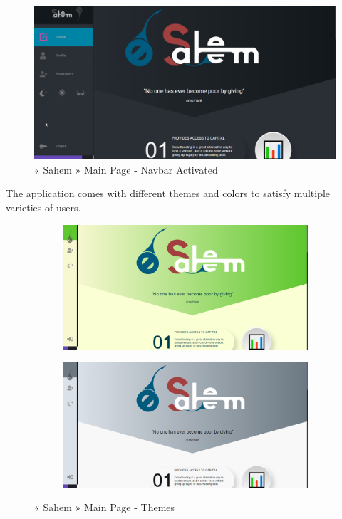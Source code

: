 \begin{figure}[H]
      \centering
      \includegraphics[scale=0.45]{assets/screen-main-navbar.png}
      \caption{« Sahem » Main Page - Navbar Activated}
      \label{fig:sahem main}
\end{figure}

The application comes with different themes and colors to satisfy multiple varieties of users.
\begin{figure}
      \centering
      \begin{subfigure}[H]{0.45\textwidth}
          \centering
          \includegraphics[width=\textwidth]{assets/screen-main-gre.png}
      \end{subfigure}
      \hfill
      \begin{subfigure}[H]{0.45\textwidth}
          \centering
          \includegraphics[width=\textwidth]{assets/screen-main-grey.png}
      \end{subfigure}
      \caption{« Sahem » Main Page - Themes}
      
 \end{figure}


